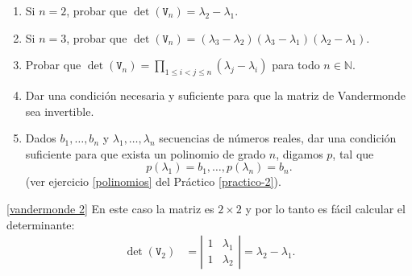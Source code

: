 \begin{enumerate}[topsep=6pt,itemsep=.4cm]
    
    \begin{enumerate}
        \item\label{vandermonde 2} Si $n=2$, probar que $\det(\mathtt V_n) = \lambda_2-\lambda_1$.
        \item\label{vandermonde 3} Si $n=3$, probar que $\det(\mathtt V_n) = (\lambda_3-\lambda_2) (\lambda_3-\lambda_1) (\lambda_2-\lambda_1)$.
        \item\label{vandermonde gral} Probar que $\det(\mathtt V_n) = \prod_{1\leq i< j \leq n}(\lambda_j-\lambda_i)$ para todo $n\in\mathbb{N}$.
        \item\label{vandermonde inv} Dar una condición necesaria y suficiente para que la matriz de Vandermonde sea invertible.
        \item\label{vandermonde sol} Dados $b_1, \ldots, b_n$  y $\lambda_1, \ldots, \lambda_n$ secuencias de números reales,  dar una condición suficiente para que exista un  polinomio de grado $n$, digamos $p$, tal que 
        $$
        p(\lambda_1)=b_1, \ldots, p(\lambda_n)=b_n.
        $$
        (ver ejercicio \ref{polinomios} del Práctico \ref{practico-2}).
    \end{enumerate}
    \rta

    \ref{vandermonde 2} En  este caso la matriz es  $2 \times 2$ y por lo tanto es fácil calcular el determinante:      
    \begin{align*}
        \det(\mathtt V_2) &= \left|\begin{matrix} 1 & \lambda_1 \\ 1 & \lambda_2 \end{matrix}\right| = \lambda_2 - \lambda_1.
    \end{align*}


\end{enumerate}
